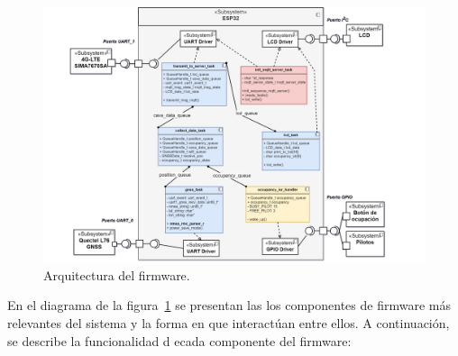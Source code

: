 \begin{figure}[htbp]
	\centering
	\includegraphics[width=1.1\textwidth]{./Figures/Arquitectura_firmware_TFE_GNSS.png}
	\caption{Arquitectura del firmware.}
	\label{fig:arq_firmware}
\end{figure}

En el diagrama de la figura~\ref{fig:arq_firmware} se presentan las los componentes de firmware más relevantes del sistema y la forma en que interactúan entre ellos. A continuación, se describe la funcionalidad d ecada componente del firmware:

